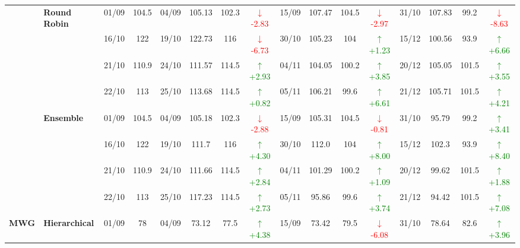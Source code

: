 {\begin{longtable}{llcc|cccc|cccc|cccc}
& \textbf{Round Robin}
& 01/09 & 104.5 & 04/09 & 105.13 & 102.3 & \textcolor{red}{\(\downarrow\)-2.83} & 15/09 & 107.47 & 104.5 & \textcolor{red}{\(\downarrow\)-2.97} & 31/10 & 107.83 & 99.2 & \textcolor{red}{\(\downarrow\)-8.63} \\

&
& 16/10 & 122 & 19/10 & 122.73 & 116 & \textcolor{red}{\(\downarrow\)-6.73} & 30/10 & 105.23 & 104 & \textcolor{green}{\(\uparrow\)+1.23} & 15/12 & 100.56 & 93.9 & \textcolor{green}{\(\uparrow\)+6.66} \\

&
& 21/10 & 110.9 & 24/10 & 111.57 & 114.5 & \textcolor{green}{\(\uparrow\)+2.93} & 04/11 & 104.05 & 100.2 & \textcolor{green}{\(\uparrow\)+3.85} & 20/12 & 105.05 & 101.5 & \textcolor{green}{\(\uparrow\)+3.55} \\

&
& 22/10 & 113 & 25/10 & 113.68 & 114.5 & \textcolor{green}{\(\uparrow\)+0.82} & 05/11 & 106.21 & 99.6 & \textcolor{green}{\(\uparrow\)+6.61} & 21/12 & 105.71 & 101.5 & \textcolor{green}{\(\uparrow\)+4.21} \\
\cmidrule(lr){2-16}


& \textbf{Ensemble}
& 01/09 & 104.5 & 04/09 & 105.18 & 102.3 & \textcolor{red}{\(\downarrow\)-2.88} & 15/09 & 105.31 & 104.5 & \textcolor{red}{\(\downarrow\)-0.81} & 31/10 & 95.79 & 99.2 & \textcolor{green}{\(\uparrow\)+3.41} \\

&
& 16/10 & 122 & 19/10 & 111.7 & 116 & \textcolor{green}{\(\uparrow\)+4.30} & 30/10 & 112.0 & 104 & \textcolor{green}{\(\uparrow\)+8.00} & 15/12 & 102.3 & 93.9 & \textcolor{green}{\(\uparrow\)+8.40} \\

&
& 21/10 & 110.9 & 24/10 & 111.66 & 114.5 & \textcolor{green}{\(\uparrow\)+2.84} & 04/11 & 101.29 & 100.2 & \textcolor{green}{\(\uparrow\)+1.09} & 20/12 & 99.62 & 101.5 & \textcolor{green}{\(\uparrow\)+1.88} \\

&
& 22/10 & 113 & 25/10 & 117.23 & 114.5 & \textcolor{green}{\(\uparrow\)+2.73} & 05/11 & 95.86 & 99.6 & \textcolor{green}{\(\uparrow\)+3.74} & 21/12 & 94.42 & 101.5 & \textcolor{green}{\(\uparrow\)+7.08} \\
\midrule




\multirow{12}{*}{\textbf{MWG}} 
& \textbf{Hierarchical}
& 01/09 & 78 & 04/09 & 73.12 & 77.5 & \textcolor{green}{\(\uparrow\)+4.38} & 15/09 & 73.42 & 79.5 & \textcolor{red}{\(\downarrow\)-6.08} & 31/10 & 78.64 & 82.6 & \textcolor{green}{\(\uparrow\)+3.96} \\


\end{longtable}}
